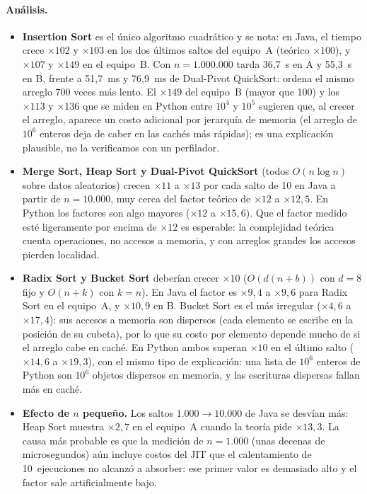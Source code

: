 \documentclass[11pt,a4paper]{article}
\begin{document}
\paragraph{An\'alisis.}
\begin{itemize}
  \item \textbf{Insertion Sort} es el \'unico algoritmo cuadr\'atico y se nota: en Java, el tiempo crece
  $\times102$ y $\times103$ en los dos \'ultimos saltos del equipo~A (te\'orico $\times100$), y $\times107$ y
  $\times149$ en el equipo~B. Con $n=1.000.000$ tarda 36,7~s en A y 55,3~s en B, frente a 51,7~ms y 76,9~ms de
  Dual-Pivot QuickSort: ordena el mismo arreglo 700 veces m\'as lento. El $\times149$ del equipo~B (mayor que
  100) y los $\times113$ y $\times136$ que se miden en Python entre $10^4$ y $10^5$ sugieren que, al crecer el
  arreglo, aparece un costo adicional por jerarqu\'ia de memoria (el arreglo de $10^6$ enteros deja de caber en
  las cach\'es m\'as r\'apidas); es una explicaci\'on plausible, no la verificamos con un perfilador.
  \item \textbf{Merge Sort, Heap Sort y Dual-Pivot QuickSort} (todos $O(n\log n)$ sobre datos aleatorios)
  crecen $\times11$ a $\times13$ por cada salto de 10 en Java a partir de $n=10.000$, muy cerca del factor
  te\'orico de $\times12$ a $\times12{,}5$. En Python los factores son algo mayores ($\times12$ a
  $\times15{,}6$). Que el factor medido
  est\'e ligeramente por encima de $\times12$ es esperable: la complejidad te\'orica cuenta operaciones, no
  accesos a memoria, y con arreglos grandes los accesos pierden localidad.
  \item \textbf{Radix Sort y Bucket Sort} deber\'ian crecer $\times10$ ($O(d(n+b))$ con $d=8$ fijo y $O(n+k)$
  con $k=n$). En Java el factor es $\times9{,}4$ a $\times9{,}6$ para Radix Sort en el equipo~A, y $\times10{,}9$
  en B. Bucket Sort es el m\'as irregular ($\times4{,}6$ a $\times17{,}4$): sus accesos a memoria son
  dispersos (cada elemento se escribe en la posici\'on de su cubeta), por lo que su costo por elemento depende
  mucho de si el arreglo cabe en cach\'e. En Python ambos superan $\times10$ en el \'ultimo salto
  ($\times14{,}6$ a $\times19{,}3$), con el mismo tipo de explicaci\'on: una lista de $10^6$ enteros de Python
  son $10^6$ objetos dispersos en memoria, y las escrituras dispersas fallan m\'as en cach\'e.
  \item \textbf{Efecto de $n$ peque\~no.} Los saltos $1.000\to10.000$ de Java se desv\'ian m\'as: Heap Sort
  muestra $\times2{,}7$ en el equipo~A cuando la teor\'ia pide $\times13{,}3$. La causa m\'as probable es que
  la medici\'on de $n=1.000$ (unas decenas de microsegundos) a\'un incluye costos del JIT que el calentamiento
  de 10~ejecuciones no alcanz\'o a absorber: ese primer valor es demasiado alto y el factor sale artificialmente
  bajo.
\end{itemize}
\end{document}
